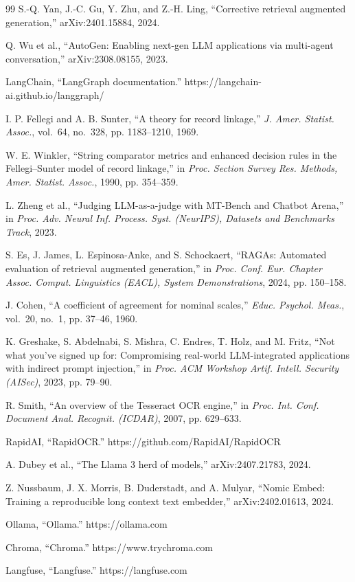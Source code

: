 \documentclass[12pt,a4paper,oneside]{report}
\begin{document}
\begin{thebibliography}{99}
 S.-Q. Yan, J.-C. Gu, Y. Zhu, and Z.-H. Ling, ``Corrective retrieval augmented generation,'' arXiv:2401.15884, 2024.

 Q. Wu et al., ``AutoGen: Enabling next-gen LLM applications via multi-agent conversation,'' arXiv:2308.08155, 2023.

 LangChain, ``LangGraph documentation.'' https://langchain-ai.github.io/langgraph/

 I. P. Fellegi and A. B. Sunter, ``A theory for record linkage,'' \emph{J. Amer. Statist. Assoc.}, vol.~64, no.~328, pp. 1183--1210, 1969.

 W. E. Winkler, ``String comparator metrics and enhanced decision rules in the Fellegi--Sunter model of record linkage,'' in \emph{Proc. Section Survey Res. Methods, Amer. Statist. Assoc.}, 1990, pp. 354--359.

 L. Zheng et al., ``Judging LLM-as-a-judge with MT-Bench and Chatbot Arena,'' in \emph{Proc. Adv. Neural Inf. Process. Syst. (NeurIPS), Datasets and Benchmarks Track}, 2023.

 S. Es, J. James, L. Espinosa-Anke, and S. Schockaert, ``RAGAs: Automated evaluation of retrieval augmented generation,'' in \emph{Proc. Conf. Eur. Chapter Assoc. Comput. Linguistics (EACL), System Demonstrations}, 2024, pp. 150--158.

 J. Cohen, ``A coefficient of agreement for nominal scales,'' \emph{Educ. Psychol. Meas.}, vol.~20, no.~1, pp. 37--46, 1960.

 K. Greshake, S. Abdelnabi, S. Mishra, C. Endres, T. Holz, and M. Fritz, ``Not what you've signed up for: Compromising real-world LLM-integrated applications with indirect prompt injection,'' in \emph{Proc. ACM Workshop Artif. Intell. Security (AISec)}, 2023, pp. 79--90.

 R. Smith, ``An overview of the Tesseract OCR engine,'' in \emph{Proc. Int. Conf. Document Anal. Recognit. (ICDAR)}, 2007, pp. 629--633.

 RapidAI, ``RapidOCR.'' https://github.com/RapidAI/RapidOCR

 A. Dubey et al., ``The Llama 3 herd of models,'' arXiv:2407.21783, 2024.

 Z. Nussbaum, J. X. Morris, B. Duderstadt, and A. Mulyar, ``Nomic Embed: Training a reproducible long context text embedder,'' arXiv:2402.01613, 2024.

 Ollama, ``Ollama.'' https://ollama.com

 Chroma, ``Chroma.'' https://www.trychroma.com

 Langfuse, ``Langfuse.'' https://langfuse.com
\end{thebibliography}
\end{document}
